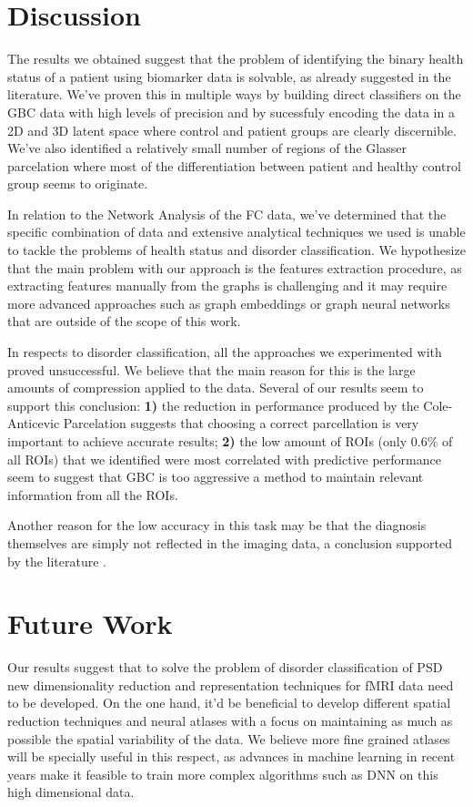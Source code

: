 \documentclass[fleqn,moreauthors,10pt]{ds_report}
\begin{document}
\section*{Discussion}
The results we obtained suggest that the problem of identifying the binary health status of a patient using biomarker data is solvable, as already suggested in the literature. We've proven this in multiple ways by building direct classifiers on the GBC data with high levels of precision and by sucessfuly encoding the data in a 2D and 3D latent space where control and patient groups are clearly discernible. We've also identified a relatively small number of regions of the Glasser parcelation where most of the differentiation between patient and healthy control group seems to originate. 

In relation to the Network Analysis of the FC data, we've determined that the specific combination of data and extensive analytical techniques we used is unable to tackle the problems of health status and disorder classification. We hypothesize that the main problem with our approach is the features extraction procedure, as extracting features manually from the graphs is challenging and it may require more advanced approaches such as graph embeddings or graph neural networks that are outside of the scope of this work.

In respects to disorder classification, all the approaches we experimented with proved unsuccessful. We believe that the main reason for this is the large amounts of compression applied to the data. Several of our results seem to support this conclusion: \textbf{1)} the reduction in performance produced by the Cole-Anticevic Parcelation suggests that choosing a correct parcellation is very important to achieve accurate results; \textbf{2)} the low amount of ROIs (only 0.6\% of all ROIs) that we identified were most correlated with predictive performance seem to suggest that GBC is too aggressive a method to maintain relevant information from all the ROIs. 

Another reason for the low accuracy in this task may be that the diagnosis themselves are simply not reflected in the imaging data, a conclusion supported by the literature \cite{Clementz2016}.

\section*{Future Work}
Our results suggest that to solve the problem of disorder classification of PSD new dimensionality reduction and representation techniques for fMRI data need to be developed. On the one hand, it'd be beneficial to develop different spatial reduction techniques and neural atlases with a focus on maintaining as much as possible the spatial variability of the data. We believe more fine grained atlases will be specially useful in this respect, as advances in machine learning in recent years make it feasible to train more complex algorithms such as DNN on this high dimensional data. 
\end{document}
